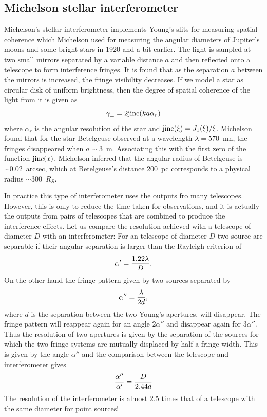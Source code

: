 \subsection{Michelson stellar interferometer}

Michelson's stellar interferometer implements Young's slits for measuring spatial coherence which Michelson used for measuring the angular diameters of Jupiter's 
moons and some bright stars in 1920 and a bit earlier. The light is sampled at two 
small mirrors separated by a variable distance $a$ and then reflected onto a telescope 
to form interference fringes. It is found that as the separation $a$ between the mirrors 
is increased, the fringe visibility decreases. If we model a star as circular disk of 
uniform brightness, then the degree of spatial coherence of the light from it is given
as 
\[
\gamma_\perp=2{\rm jinc}(ka\alpha_r)
\]
where $\alpha_r$ is the angular resolution of the star and 
${\rm jinc}(\xi)={J_1(\xi)/\xi}$. Michelson found that for the star Betelgeuse observed
at a wavelength $\lambda=570$~nm, the fringes disappeared when $a\sim 3$~m. 
Associating this with the first zero of the function ${\rm jin}c(x)$, Michelson inferred that
the angular radius of Betelgeuse is $\sim 0.02$~arcsec, which at Betelgeuse's distance
200~pc corresponds to a physical radius $\sim 300$~$R_S$.

In practice this type of interferometer uses the outputs fro many telescopes. However, this is only to reduce the time taken for observations, and it is actually the outputs from pairs of telescopes that are combined to produce the interference effects. Let us compare the resolution achieved with a telescope of diameter $D$ with an interferometer: For an telescope of diameter $D$ two source are separable if their angular separation is larger than the Rayleigh criterion of
\[ 
\alpha'={1.22\lambda\over D}.
\]
\noindent
On the other hand the fringe pattern given by two sources separated by 
\[
\alpha''={\lambda\over 2d},
\]
\noindent
where $d$ is the separation between the two Young's apertures, will disappear. The fringe pattern will reappear again for an angle $2\alpha''$ and disappear again for $3\alpha''$. Thus the resolution of two apertures is given by the separation of the sources for which the two fringe systems are mutually displaced by half a fringe width. This is given by the angle $\alpha''$ and the comparison between the telescope and interferometer gives
\[
{\alpha''\over\alpha'}={D\over 2.44d}
\]
\noindent
The resolution of the interferometer is almost 2.5 times that of a telescope with the same diameter for point sources! 

